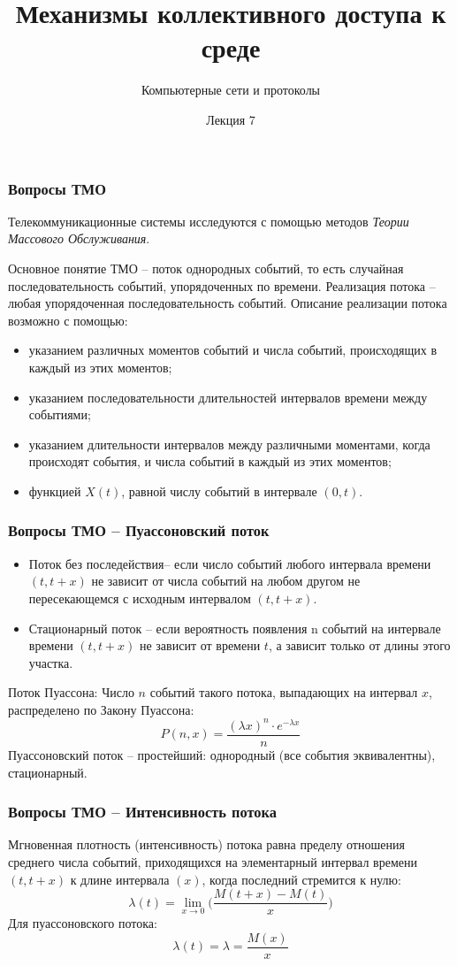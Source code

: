 \documentclass[utf8]{beamer}
\title{Механизмы коллективного доступа к среде}
\author {Компьютерные сети и протоколы}
\date{Лекция 7}
\begin{document}
\begin{frame}
\titlepage
\end{frame}
\begin{frame}
\frametitle{Вопросы ТМО}
Телекоммуникационные системы исследуются с помощью методов \emph{Теории Массового Обслуживания}.

Основное понятие ТМО -- поток однородных событий, то есть случайная последовательность событий, упорядоченных по времени. Реализация потока -- любая упорядоченная последовательность событий.
\newline
\newline
Описание реализации потока возможно с помощью:
\begin{itemize}
	\item указанием различных моментов событий и числа событий, происходящих в каждый из этих моментов;
	\item указанием последовательности длительностей интервалов времени между событиями;
	\item указанием длительности интервалов между различными моментами, когда происходят события, и числа событий в каждый из этих моментов;
	\item функцией $X(t)$, равной числу событий в интервале $(0,t)$.
\end{itemize}
\end{frame}
\begin{frame}
\frametitle{Вопросы ТМО -- Пуассоновский поток}
\begin{itemize}
	\item Поток без последействия-- если число событий любого интервала времени $(t, t + x)$ не зависит от числа событий на любом другом не пересекающемся с исходным интервалом $(t, t + x)$.
	\item Стационарный поток  -- если вероятность появления n событий на интервале времени $(t, t + x)$ не зависит от времени $t$, а зависит только от длины этого участка.
\end{itemize}
Поток Пуассона: Число $n$ событий такого потока, выпадающих на интервал $x$, распределено по Закону Пуассона:
$$
P (n, x) = \frac{(\lambda x)^n\cdot e^{-\lambda x}}{n\!}
$$
Пуассоновский поток -- простейший: однородный (все события эквивалентны), стационарный.
\end{frame}
\begin{frame}
\frametitle{Вопросы ТМО -- Интенсивность потока}
Мгновенная плотность (интенсивность) потока равна пределу отношения среднего числа событий, приходящихся на элементарный интервал времени $(t, t + x)$ к длине интервала $(x)$, когда последний стремится к нулю:
$$
\lambda (t) = \lim_{x \rightarrow 0} \Big( \frac{M(t+x) - M(t)}{x}\Big)
$$
Для пуассоновского потока:
$$
\lambda (t) = \lambda = \frac{M(x)}{x}
$$
\end{frame}
\end{document}
